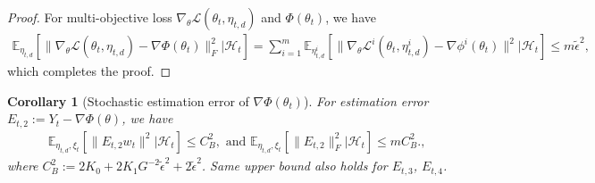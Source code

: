\documentclass[twoside]{article} %
\theoremstyle{plain}
\newtheorem{corollary}[theorem]{Corollary}
\theoremstyle{definition}
\theoremstyle{remark}
\newcommand{\Y}{Y}
\newcommand{\tepsilon}{\tilde{\epsilon}}
\newcommand{\fL}{\mathcal{L}}
\newcommand{\calH}{\mathcal{H}}
\begin{document}
\begin{proof}
    For multi-objective loss $\nabla_{\theta}\fL(\theta_{t},\eta_{t,d})$ and $\Phi(\theta_t)$, we have
    \begin{align}
        \mathbb{E}_{\eta_{t,d}}[\|\nabla_{\theta}\fL(\theta_t, \eta_{t,d}) - \nabla \Phi(\theta_t) \|_F^2|\calH_t] = \sum_{i=1}^{m} \mathbb{E}_{\eta^i_{t,d}}[\|\nabla_{\theta}\fL^i(\theta_t,\eta^i_{t,d}) - \nabla \phi^i(\theta_t) \|^2|\calH_t]\leq m\tepsilon^2, \nonumber
    \end{align}
which completes the proof.
\end{proof}
\begin{corollary}[Stochastic estimation error of $\nabla \Phi(\theta_t)$]\label{Corollary: estimation error of true gradient}
    For estimation error $E_{t,2}:=Y_{t}-\nabla\Phi(\theta)$, we have
    \begin{align}
        &\mathbb{E}_{\eta_{t,d},{\xi}_t}[\|E_{t,2}w_t\|^2|\calH_t]\leq C_B^2,\text{ and }\mathbb{E}_{\eta_{t,d},{\xi}_t}[\|E_{t,2}\|_F^2|\calH_t]\leq {m C_B^2}.
        \label{eq: bias bound},
    \end{align}
    where $C_B^2:= {2K_0}+{2K_1G^{-2}}\tepsilon^2+2\tepsilon^2$. Same upper bound also holds for $E_{t,3}$, $E_{t,4}$. 

\end{corollary}
\end{document}
